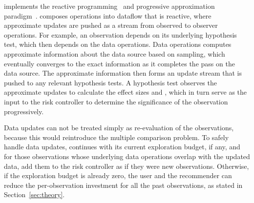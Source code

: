 \system{} implements the reactive programming~\cite{wan2000functional} and progressive approximation paradigm~\cite{vizdom, zgraggen2016progressive}. \system{} composes operations into dataflow that is reactive, where approximate updates are pushed as a stream from observed to observer operations. For example, an observation depends on its underlying hypothesis test, which then depends on the data operations. Data operations computes approximate information about the data source based on sampling, which eventually converges to the exact information as it completes the pass on the data source. The approximate information then forms an update stream that is pushed to any relevant hypothesis tests. A hypothesis test observes the approximate updates to calculate the effect sizes and \pvals, which in turn serve as the input to the risk controller to determine the significance of the observation progressively. 

Data updates can not be treated simply as re-evaluation of the observations, because this would reintroduce the multiple comparison problem.  To safely handle data updates, \system{} continues with its current exploration budget, if any, and for those observations whose underlying data operations overlap with the updated data, add them to the risk controller as if they were new observations.  Otherwise, if the exploration budget is already zero, the user and the recommender can reduce the per-observation investment for all the past observations, as stated in Section~\ref{sec:theory}.